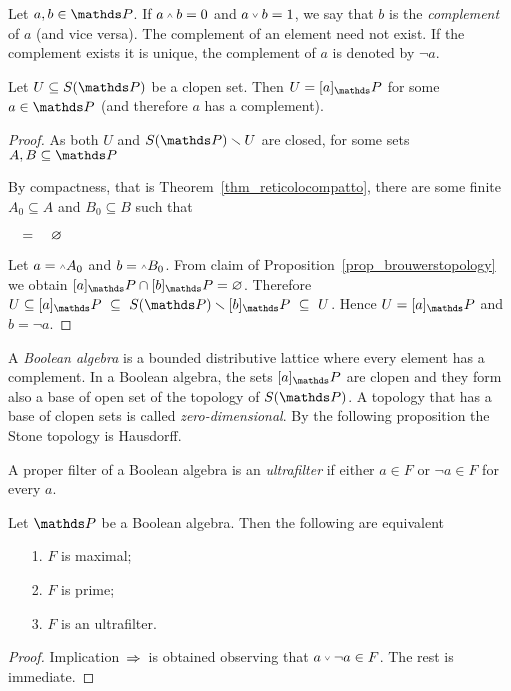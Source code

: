 \documentclass[creche.tex]{subfiles}
\begin{document}
Let $a,b\in\PP$. If $a\swedge  b=0$ and $a\svee b=1$, we say that $b$ is the \emph{complement\/} of $a$ (and vice versa). The complement of an element need not exist. If the complement exists it is unique, the complement of $a$ is denoted by \emph{$\neg a$}. 

\begin{lemma}\label{Stone_aperti_chiusi}
Let $U\subseteq S(\PP)$ be a clopen set. Then $U=[a]_\PP$ for some $a\in\PP$ (and therefore $a$ has a complement).
\end{lemma}

\begin{proof}
As both $U$ and $S(\PP)\sm U$ are closed, for some sets $A, B\subseteq\PP$




By compactness, that is Theorem~\ref{thm_reticolocompatto}, there are some finite $A_0\subseteq A$ and $B_0\subseteq B$ such that

$\quad=\quad\varnothing$

Let $a=\swedge A_0$ and $b=\swedge B_0$. From claim  of Proposition~\ref{prop_brouwerstopology} we obtain $[a]_\PP\cap[b]_\PP=\0$. Therefore $U\subseteq [a]_\PP\ \subseteq\ S(\PP)\sm  [b]_\PP\ \subseteq\ U$. Hence $U= [a]_\PP$ and $b=\neg a$.
\end{proof}

A \emph{Boolean algebra\/} is a bounded distributive lattice where every element has a complement. In a Boolean algebra, the sets $[a]_\PP$ are clopen and they form also a base of open set of the topology of $S(\PP)$. A topology that has a base of clopen sets is called \emph{zero-dimensional}. By the following proposition the Stone topology is Hausdorff.

A proper filter of a Boolean algebra is an \emph{ultrafilter\/} if either $a\in F$ or $\neg a\in F$ for every $a$.

\begin{proposition}
Let $\PP$ be a Boolean algebra. Then the following are equivalent
\begin{itemize}
\item[1.] $F$ is maximal;
\item[2.] $F$ is prime;
\item[3.] $F$ is an ultrafilter.
\end{itemize}
\end{proposition}
\begin{proof}
Implication \,$\Rightarrow$\, is obtained observing that $a\svee\neg a\in F$. The rest is immediate.
\end{proof}
\end{document}
